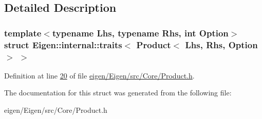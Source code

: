 \subsection{Detailed Description}
\subsubsection*{template$<$typename Lhs, typename Rhs, int Option$>$\newline
struct Eigen\+::internal\+::traits$<$ Product$<$ Lhs, Rhs, Option $>$ $>$}



Definition at line \hyperlink{eigen_2_eigen_2src_2_core_2_product_8h_source_l00020}{20} of file \hyperlink{eigen_2_eigen_2src_2_core_2_product_8h_source}{eigen/\+Eigen/src/\+Core/\+Product.\+h}.



The documentation for this struct was generated from the following file\+:\begin{DoxyCompactItemize}
\item 
eigen/\+Eigen/src/\+Core/\+Product.\+h\end{DoxyCompactItemize}
